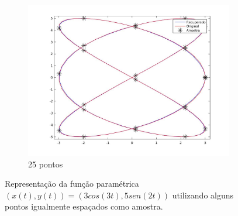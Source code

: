 \begin{frame}
\begin{figure}
\begin{subfigure}[b]{0.31\textwidth}
		\label{fig:ex22}
	\end{subfigure}
	\hfill
	\begin{subfigure}[b]{0.31\textwidth}
		\centering
		\includegraphics[trim={5cm 2cm 3cm 2cm},clip,width=\textwidth]{imagens/rep_2_25.jpg}
		\caption{25 pontos}
		\label{fig:ex23}
	\end{subfigure} %
	\caption{Representação da função paramétrica $(x(t), y(t)) = (3 cos(3t), 5sen(2t))$ utilizando alguns pontos igualmente espaçados como amostra.}
	\label{fig:ex2rep}
\end{figure}


\end{frame}


